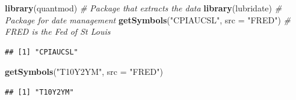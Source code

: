 \documentclass[]{krantz}
\makeatletter
\newenvironment{Shaded}{\begin{snugshade}}{\end{snugshade}}
\newcommand{\CommentTok}[1]{\textcolor[rgb]{0.37,0.37,0.37}{\textit{#1}}}
\newcommand{\DataTypeTok}[1]{\textcolor[rgb]{0.27,0.27,0.27}{#1}}
\newcommand{\KeywordTok}[1]{\textcolor[rgb]{0.27,0.27,0.27}{\textbf{#1}}}
\newcommand{\NormalTok}[1]{#1}
\newcommand{\StringTok}[1]{\textcolor[rgb]{0.5,0.5,0.5}{#1}}
\newenvironment{kframe}{%
\medskip{}
\setlength{\fboxsep}{.8em}
 \def\at@end@of@kframe{}%
 \ifinner\ifhmode%
  \def\at@end@of@kframe{\end{minipage}}%
  \begin{minipage}{\columnwidth}%
 \fi\fi%
 \def\FrameCommand##1{\hskip\@totalleftmargin \hskip-\fboxsep
 \colorbox{shadecolor}{##1}\hskip-\fboxsep
     \hskip-\linewidth \hskip-\@totalleftmargin \hskip\columnwidth}%
 \MakeFramed {\advance\hsize-\width
   \@totalleftmargin\z@ \linewidth\hsize
   \@setminipage}}%
 {\par\unskip\endMakeFramed%
 \at@end@of@kframe}
\renewenvironment{Shaded}{\begin{kframe}}{\end{kframe}}
\theoremstyle{definition}
\theoremstyle{definition}
\theoremstyle{definition}
\theoremstyle{remark}
\makeatother
\begin{document}
\footnotesize

\begin{Shaded}
\begin{Highlighting}[]
\KeywordTok{library}\NormalTok{(quantmod)                                     }\CommentTok{# Package that extracts the data}
\KeywordTok{library}\NormalTok{(lubridate)                                    }\CommentTok{# Package for date management}
\KeywordTok{getSymbols}\NormalTok{(}\StringTok{"CPIAUCSL"}\NormalTok{, }\DataTypeTok{src =} \StringTok{"FRED"}\NormalTok{)                  }\CommentTok{# FRED is the Fed of St Louis}
\end{Highlighting}
\end{Shaded}

\begin{verbatim}
## [1] "CPIAUCSL"
\end{verbatim}

\begin{Shaded}
\begin{Highlighting}[]
\KeywordTok{getSymbols}\NormalTok{(}\StringTok{"T10Y2YM"}\NormalTok{, }\DataTypeTok{src =} \StringTok{"FRED"}\NormalTok{) }
\end{Highlighting}
\end{Shaded}

\begin{verbatim}
## [1] "T10Y2YM"
\end{verbatim}
\end{document}
